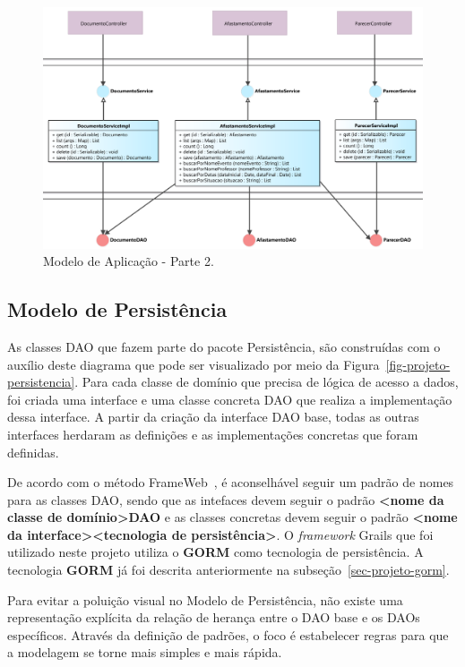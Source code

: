 \begin{figure}[!h]
	\centering
	\includegraphics[width=1\textwidth]{figuras/fig-projeto-aplicacao2.png}
	\caption{Modelo de Aplicação - Parte 2.}
	\label{fig-projeto-aplicacao2}
\end{figure}
   

\subsection{Modelo de Persistência}
\label{sec-projeto-modelo-persistencia}

As classes DAO que fazem parte do pacote Persistência, são construídas com o auxílio deste diagrama que pode ser visualizado por meio da Figura~\ref{fig-projeto-persistencia}.
Para cada classe de domínio que precisa de lógica de acesso a dados, foi criada uma interface e uma classe concreta DAO que realiza a implementação dessa interface. A partir da criação da interface DAO base, todas as outras interfaces herdaram as definições e as implementações concretas que foram definidas.

De acordo com o método FrameWeb~\cite{souza:masterthesis07,souza-celebratingfalbo20}, é aconselhável seguir um padrão de nomes para as classes DAO, sendo que as intefaces devem seguir o padrão \textbf{<nome da classe de domínio>DAO} e as classes concretas devem seguir o padrão \textbf{<nome da interface><tecnologia de persistência>}. O \textit{framework} Grails que foi utilizado neste projeto utiliza o \textbf{GORM} como tecnologia de persistência. A tecnologia \textbf{GORM} já foi descrita anteriormente na subseção~\ref{sec-projeto-gorm}.

Para evitar a poluição visual no Modelo de Persistência, não existe uma representação explícita da relação de herança entre o DAO base e os DAOs específicos. Através da definição de padrões, o foco é estabelecer regras para que a modelagem se torne mais simples e mais rápida.    

